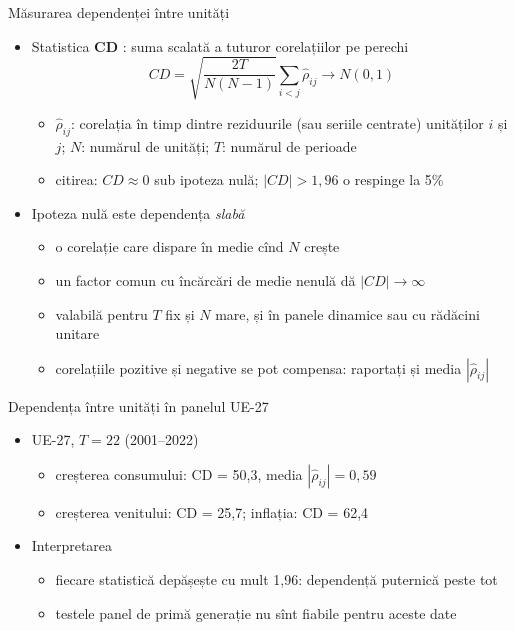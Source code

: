 \begin{frame}{Măsurarea dependenței între unități}
\itemsize{\small}
\begin{itemize}
    \item Statistica \textbf{CD} : suma scalată a tuturor corelațiilor pe perechi \[ CD = \sqrt{\dfrac{2T}{N(N - 1)}}\sum_{i<j}\hat\rho_{ij} \to N(0, 1) \]
    \begin{itemize}
        \item $\hat\rho_{ij}$: corelația în timp dintre reziduurile (sau seriile centrate) unităților $i$ și $j$; $N$: numărul de unități; $T$: numărul de perioade
        \item citirea: $CD \approx 0$ sub ipoteza nulă; $|CD| > 1{,}96$ o respinge la 5\%
    \end{itemize}
    \item Ipoteza nulă este dependența \emph{slabă} 
    \begin{itemize}
        \item o corelație care dispare în medie cînd $N$ crește
        \item un factor comun cu încărcări de medie nenulă dă $|CD| \to \infty$
        \item valabilă pentru $T$ fix și $N$ mare, și în panele dinamice sau cu rădăcini unitare
        \item corelațiile pozitive și negative se pot compensa: raportați și media $|\hat\rho_{ij}|$
    \end{itemize}
\end{itemize}
\end{frame}

\begin{frame}{Dependența între unități în panelul UE-27}
\itemsize{\small}
\begin{itemize}
    \item UE-27, $T = 22$ (2001--2022)
    \begin{itemize}
        \item creșterea consumului: CD = 50{,}3, media $|\hat\rho_{ij}| = 0{,}59$
        \item creșterea venitului: CD = 25{,}7; inflația: CD = 62{,}4
    \end{itemize}
    \item Interpretarea
    \begin{itemize}
        \item fiecare statistică depășește cu mult 1,96: dependență puternică peste tot
        \item testele panel de primă generație nu sînt fiabile pentru aceste date
    \end{itemize}
\end{itemize}
\end{frame}

